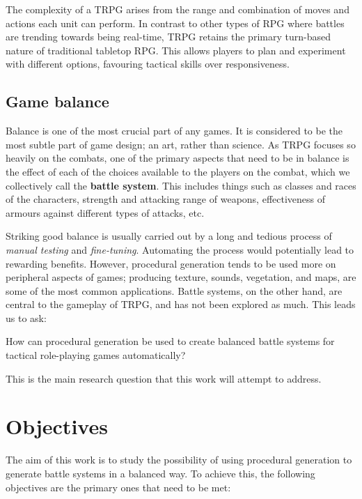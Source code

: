 The complexity of a TRPG arises from the range and combination of moves and actions each unit can perform. In contrast to other types of RPG where battles are trending towards being real-time, TRPG retains the primary turn-based nature of traditional tabletop RPG.\cite[90]{moore2011basics} This allows players to plan and experiment with different options, favouring tactical skills over responsiveness.

\subsection{Game balance}

Balance is one of the most crucial part of any games. It is considered to be the most subtle part of game design; an art, rather than science.\cite{schell2008art} As TRPG focuses so heavily on the combats, one of the primary aspects that need to be in balance is the effect of each of the choices available to the players on the combat, which we collectively call the \textbf{battle system}. This includes things such as classes and races of the characters, strength and attacking range of weapons, effectiveness of armours against different types of attacks, etc.

Striking good balance is usually carried out by a long and tedious process of \textit{manual testing} and \textit{fine-tuning}. Automating the process would potentially lead to rewarding benefits. %
However, procedural generation tends to be used more on peripheral aspects of games; producing texture, sounds, vegetation, and maps, are some of the most common applications.\cite{hendrikx2013procedural} Battle systems, on the other hand, are central to the gameplay of TRPG, and has not been explored as much. This leads us to ask:

\begin{tcolorbox}
	How can procedural generation be used to create balanced battle systems for tactical role-playing games automatically?
\end{tcolorbox}

This is the main research question that this work will attempt to address.

\section{Objectives}

The aim of this work is to study the possibility of using procedural generation to generate battle systems in a balanced way. To achieve this, the following objectives are the primary ones that need to be met:

